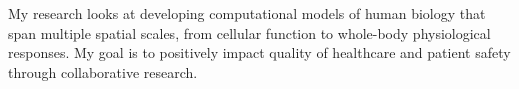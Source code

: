 \break
\begin{cvparagraph}
\par
{My research looks at developing computational models of human biology that span multiple spatial scales, from cellular function to whole-body physiological responses. My goal is to positively impact quality of healthcare and patient safety through collaborative research.}
\end{cvparagraph}